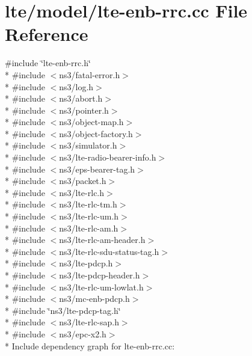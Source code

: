 \hypertarget{lte-enb-rrc_8cc}{}\section{lte/model/lte-\/enb-\/rrc.cc File Reference}
\label{lte-enb-rrc_8cc}
{\ttfamily \#include \char`\"{}lte-\/enb-\/rrc.\+h\char`\"{}}\\*
{\ttfamily \#include $<$ns3/fatal-\/error.\+h$>$}\\*
{\ttfamily \#include $<$ns3/log.\+h$>$}\\*
{\ttfamily \#include $<$ns3/abort.\+h$>$}\\*
{\ttfamily \#include $<$ns3/pointer.\+h$>$}\\*
{\ttfamily \#include $<$ns3/object-\/map.\+h$>$}\\*
{\ttfamily \#include $<$ns3/object-\/factory.\+h$>$}\\*
{\ttfamily \#include $<$ns3/simulator.\+h$>$}\\*
{\ttfamily \#include $<$ns3/lte-\/radio-\/bearer-\/info.\+h$>$}\\*
{\ttfamily \#include $<$ns3/eps-\/bearer-\/tag.\+h$>$}\\*
{\ttfamily \#include $<$ns3/packet.\+h$>$}\\*
{\ttfamily \#include $<$ns3/lte-\/rlc.\+h$>$}\\*
{\ttfamily \#include $<$ns3/lte-\/rlc-\/tm.\+h$>$}\\*
{\ttfamily \#include $<$ns3/lte-\/rlc-\/um.\+h$>$}\\*
{\ttfamily \#include $<$ns3/lte-\/rlc-\/am.\+h$>$}\\*
{\ttfamily \#include $<$ns3/lte-\/rlc-\/am-\/header.\+h$>$}\\*
{\ttfamily \#include $<$ns3/lte-\/rlc-\/sdu-\/status-\/tag.\+h$>$}\\*
{\ttfamily \#include $<$ns3/lte-\/pdcp.\+h$>$}\\*
{\ttfamily \#include $<$ns3/lte-\/pdcp-\/header.\+h$>$}\\*
{\ttfamily \#include $<$ns3/lte-\/rlc-\/um-\/lowlat.\+h$>$}\\*
{\ttfamily \#include $<$ns3/mc-\/enb-\/pdcp.\+h$>$}\\*
{\ttfamily \#include \char`\"{}ns3/lte-\/pdcp-\/tag.\+h\char`\"{}}\\*
{\ttfamily \#include $<$ns3/lte-\/rlc-\/sap.\+h$>$}\\*
{\ttfamily \#include $<$ns3/epc-\/x2.\+h$>$}\\*
Include dependency graph for lte-\/enb-\/rrc.cc\+:
